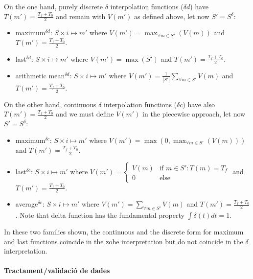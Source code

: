 On the one hand, purely discrete $\delta$ interpolation functions
($\delta d$) have $T(m')=\frac{T_f+T_0}{2}$ and remain with $V(m')$ as
defined above, let now $S'=S^{\delta}$:
\begin{itemize}
\item maximum$^{\delta d}$: $S \times i \mapsto m'$ where $V(m') =
  \max_{\forall m \in S'}(V(m))$ and $T(m')=\frac{T_f+T_0}{2}$.
\item last$^{\delta d}$: $S \times i \mapsto m'$ where $V(m') =
  \max(S')$ and $T(m')=\frac{T_f+T_0}{2}$.
\item arithmetic mean$^{\delta d}$: $S \times i \mapsto m'$ where $V(m')
  = \frac{1}{|S'|} \sum\limits_{\forall m\in S'} V(m)$ and
  $T(m')=\frac{T_f+T_0}{2}$. 
\end{itemize}
On the other hand, continuous $\delta$ interpolation functions
($\delta c$) have also $T(m')=\frac{T_f+T_0}{2}$ and we must define
$V(m')$ in the piecewise approach, let now $S'=S^{\delta}$:
\begin{itemize}
\item maximum$^{\delta c}$: $S \times i \mapsto m'$ where $V(m') = \max(0,
  \max_{\forall m \in S'}(V(m)))$ and $T(m')=\frac{T_f+T_0}{2}$.
\item last$^{\delta c}$: $S \times i \mapsto m'$ where $V(m') = 
\begin{cases}
V(m) & \text{if } m\in S':T(m)=T_f \\
0 & \text{else}
\end{cases}$ and $T(m')=\frac{T_f+T_0}{2}$.
\item average$^{\delta c}$: $S \times i \mapsto m'$ where $V(m') =
  \sum\limits_{\forall m \in S'} V(m)$ and
  $T(m')=\frac{T_f+T_0}{2}$. Note that delta function has the
  fundamental property $\int \delta(t)dt = 1$.
\end{itemize}

In these two families shown, the continuous and the discrete form for
maximum and last functions coincide in the zohe interpretation but do
not coincide in the $\delta$ interpretation. 


\paragraph{Tractament/validació de dades}\todo{}

